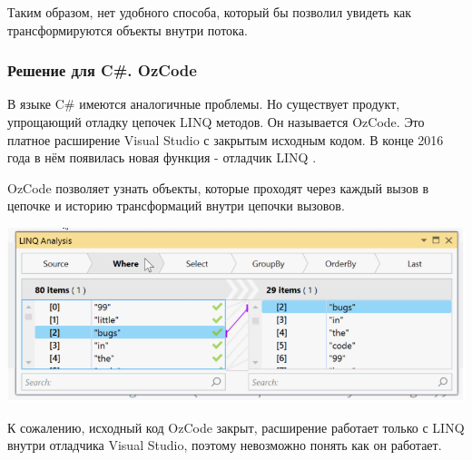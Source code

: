 Таким образом, нет удобного способа, который бы позволил увидеть как трансформируются объекты внутри потока.

\subsubsection{Решение для C\#. OzCode}
В языке C\# имеются аналогичные проблемы. Но существует продукт, упрощающий отладку цепочек LINQ методов. Он называется OzCode. Это платное расширение Visual Studio \cite{ms:vs} с закрытым исходным кодом. В конце 2016 года в нём появилась новая функция - отладчик LINQ \cite{ms:ozcode}.

OzCode позволяет узнать объекты, которые проходят через каждый вызов в цепочке и историю трансформаций внутри цепочки вызовов.

\includegraphics[scale=0.6]{chapter1/img/linq.png}

К сожалению, исходный код OzCode закрыт, расширение работает только с LINQ внутри отладчика Visual Studio, поэтому невозможно понять как он работает. 
